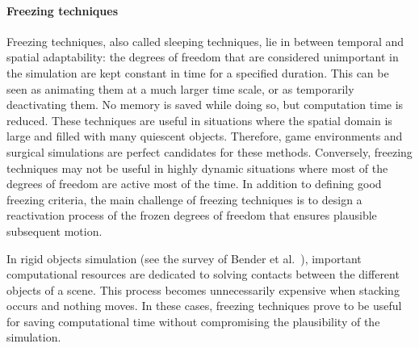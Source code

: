 \paragraph*{Freezing techniques}
Freezing techniques, also called sleeping techniques, lie in between temporal and spatial adaptability: the degrees of freedom that are considered unimportant in the simulation are kept constant in time for a specified duration.
This can be seen as animating them at a much larger time scale, or as temporarily deactivating them.
No memory is saved while doing so, but computation time is reduced.
These techniques are useful in situations where the spatial domain is large and filled with many quiescent objects.
Therefore, game environments and surgical simulations are perfect candidates for these methods.
Conversely, freezing techniques may not be useful in highly dynamic situations where most of the degrees of freedom are active most of the time.
In addition to defining good freezing criteria, the main challenge of freezing techniques is to design a reactivation process of the frozen degrees of freedom that ensures plausible subsequent motion.

In rigid objects simulation (see the survey of Bender et al.~\cite{Bender2012:rigid}), important computational resources are dedicated to solving contacts between the different objects of a scene.
This process becomes unnecessarily expensive when stacking occurs and nothing moves.
In these cases, freezing techniques prove to be useful for saving computational time without compromising the plausibility of the simulation.

